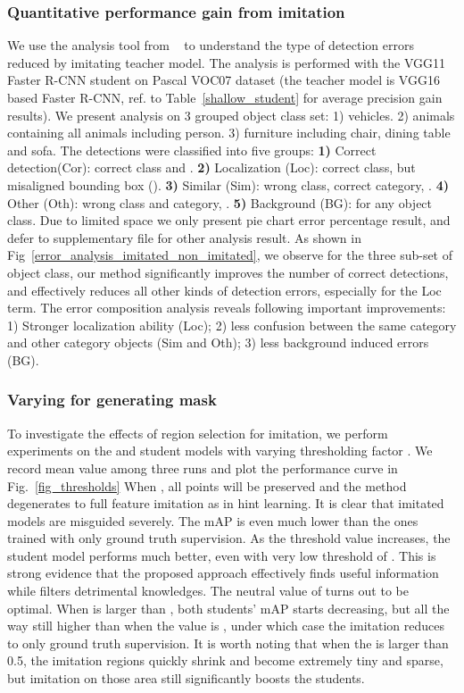 \documentclass[10pt,twocolumn,letterpaper]{article}
\begin{document}
\vspace{-3mm}
\subsubsection{Quantitative performance gain from imitation}\label{exp_imitation_gain_error_perspective}

We use the analysis tool from ~\cite{hoiem2012diagnosing} to understand the type of detection errors reduced by imitating teacher model. The analysis is performed with the VGG11 Faster R-CNN student on Pascal VOC07 dataset (the teacher model is VGG16 based Faster R-CNN, ref. to Table~\ref{shallow_student} for average precision gain results). We present analysis on 3 grouped object class set: 1) vehicles. 2)  animals containing all animals including person. 3) furniture including chair, dining table and sofa. The detections were classified into five groups: 
\textbf{1)} Correct detection(Cor): correct class and .
\textbf{2)} Localization (Loc): correct class, but misaligned bounding box (). 
\textbf{3)} Similar (Sim): wrong class, correct category, .
\textbf{4)} Other (Oth): wrong class and category, . 
\textbf{5)} Background (BG):  for any object class.
Due to limited space we only present pie chart error percentage result, and defer to supplementary file for other analysis result. 
As shown in Fig~\ref{error_analysis_imitated_non_imitated}, we observe for the three sub-set of object class, our method significantly improves the number of correct detections, and effectively reduces all other kinds of detection errors, especially for the Loc term. The error  composition analysis reveals following important improvements: 1) Stronger localization ability (Loc); 2) less confusion between the same category and other category objects (Sim and Oth); 3) less background induced errors (BG).

\vspace{-3mm}
\subsubsection{Varying  for generating mask}
\label{vary_psi} 
To investigate the effects of region selection for imitation, we perform experiments on the  and  student models with varying thresholding factor . We record mean value among three runs and plot the performance curve in Fig.~\ref{fig_thresholds}
When  , all points will be preserved and the method degenerates to full feature imitation as in hint learning. It is clear that imitated models are misguided severely. The mAP is even much lower than the ones trained with only ground truth supervision. As the threshold value increases, the student model performs much better, even with very low threshold of . This is strong evidence that the proposed approach effectively finds useful information while filters detrimental knowledges. The neutral value of  turns out to be optimal. 
When  is larger than , both students' mAP starts decreasing, but all the way still higher than when the value is , under which case the imitation reduces to only ground truth supervision. It is worth noting that when the  is larger than 0.5, the imitation regions quickly shrink and become extremely tiny and sparse, but imitation on those area still significantly boosts the students.
\end{document}
